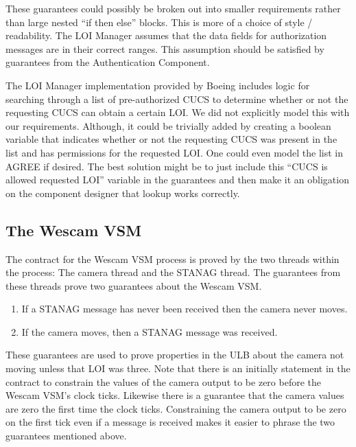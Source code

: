 \documentclass{llncs}
\begin{document}
These guarantees could possibly be broken out into smaller requirements rather than large nested ``if then else'' blocks.  This is more of a choice of style / readability. The LOI Manager assumes that the data fields for authorization messages are in their correct ranges.  This assumption should be satisfied by guarantees from the Authentication Component.

The LOI Manager implementation provided by Boeing includes logic for searching through a list of pre-authorized CUCS to determine whether or not the requesting CUCS can obtain a certain LOI.  We did not explicitly model this with our requirements.  Although, it could be trivially added by creating a boolean variable that indicates whether or not the requesting CUCS was present in the list and has permissions for the requested LOI.  One could even model the list in AGREE if desired.  The best solution might be to just include this ``CUCS is allowed requested LOI'' variable in the guarantees and then make it an obligation on the component designer that lookup works correctly.


\clearpage
\subsection{The Wescam VSM}

The contract for the Wescam VSM process is proved by the two threads within the process: The camera thread and the STANAG thread. The guarantees from these threads prove two guarantees about the Wescam VSM.

\begin{enumerate}
\item If a STANAG message has never been received then the camera never moves.

\item If the camera moves, then a STANAG message was received.
\end{enumerate}



These guarantees are used to prove properties in the ULB about the camera not moving unless that LOI was three.  Note that there is an initially statement in the contract to constrain the values of the camera output to be zero before the Wescam VSM's clock ticks.  Likewise there is a guarantee that the camera values are zero the first time the clock ticks.  Constraining the camera output to be zero on the first tick even if a message is received makes it easier to phrase the two guarantees mentioned above.
\end{document}
